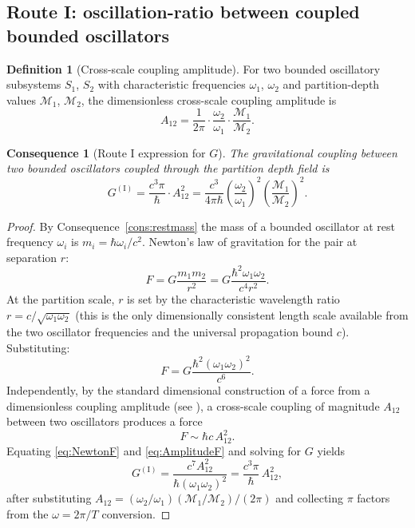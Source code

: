 \documentclass[11pt,twocolumn,a4paper]{article}
\theoremstyle{axiomstyle}
\theoremstyle{conseqstyle}
\newtheorem{consequence}{Consequence}
\theoremstyle{definition}
\newtheorem{definition}{Definition}
\theoremstyle{remark}
\newcommand{\Depth}{\mathcal{M}}
\begin{document}
\subsection{Route I: oscillation-ratio between coupled bounded oscillators}

\begin{definition}[Cross-scale coupling amplitude]\label{def:A12}
For two bounded oscillatory subsystems $S_{1}$, $S_{2}$ with characteristic frequencies $\omega_{1}$, $\omega_{2}$ and partition-depth values $\Depth_{1}$, $\Depth_{2}$, the dimensionless cross-scale coupling amplitude is
\begin{equation}
A_{12}=\frac{1}{2\pi}\cdot\frac{\omega_{2}}{\omega_{1}}\cdot\frac{\Depth_{1}}{\Depth_{2}}.
\end{equation}
\end{definition}

\begin{consequence}[Route I expression for $G$]\label{cons:routeI}
The gravitational coupling between two bounded oscillators coupled through the partition depth field is
\begin{equation}
G^{(\mathrm{I})}=\frac{c^{3}\pi}{\hbar}\cdot A_{12}^{2}=\frac{c^{3}}{4\pi\hbar}\left(\frac{\omega_{2}}{\omega_{1}}\right)^{2}\!\left(\frac{\Depth_{1}}{\Depth_{2}}\right)^{2}.
\end{equation}
\end{consequence}

\begin{proof}
By Consequence~\ref{cons:restmass} the mass of a bounded oscillator at rest frequency $\omega_{i}$ is $m_{i}=\hbar\omega_{i}/c^{2}$. Newton's law of gravitation for the pair at separation $r$:
\begin{equation}
F=G\frac{m_{1}m_{2}}{r^{2}}=G\frac{\hbar^{2}\omega_{1}\omega_{2}}{c^{4}r^{2}}.
\end{equation}
At the partition scale, $r$ is set by the characteristic wavelength ratio $r=c/\sqrt{\omega_{1}\omega_{2}}$ (this is the only dimensionally consistent length scale available from the two oscillator frequencies and the universal propagation bound $c$). Substituting:
\begin{equation}
F=G\frac{\hbar^{2}(\omega_{1}\omega_{2})^{2}}{c^{6}}.\label{eq:NewtonF}
\end{equation}
Independently, by the standard dimensional construction of a force from a dimensionless coupling amplitude (see \citet{kleinertbook}), a cross-scale coupling of magnitude $A_{12}$ between two oscillators produces a force
\begin{equation}
F\sim \hbar c\, A_{12}^{2}.\label{eq:AmplitudeF}
\end{equation}
Equating \eqref{eq:NewtonF} and \eqref{eq:AmplitudeF} and solving for $G$ yields
\begin{equation}
G^{(\mathrm{I})}=\frac{c^{7}A_{12}^{2}}{\hbar(\omega_{1}\omega_{2})^{2}}=\frac{c^{3}\pi}{\hbar}\,A_{12}^{2},
\end{equation}
after substituting $A_{12}=(\omega_{2}/\omega_{1})(\Depth_{1}/\Depth_{2})/(2\pi)$ and collecting $\pi$ factors from the $\omega=2\pi/T$ conversion.
\end{proof}
\end{document}
